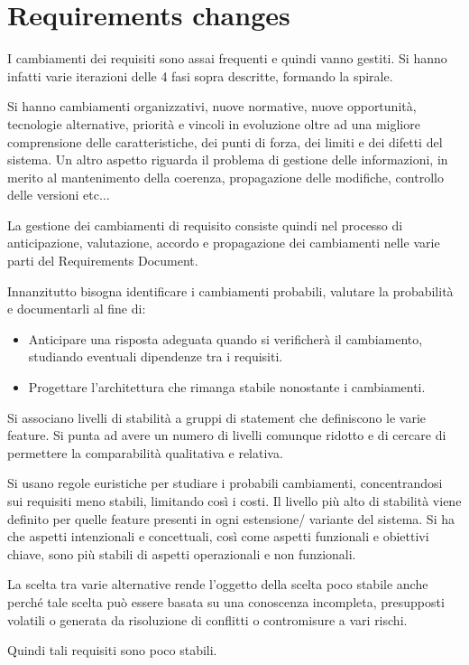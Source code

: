 \section{Requirements changes}
I cambiamenti dei requisiti sono assai frequenti e quindi vanno gestiti. Si hanno
infatti varie iterazioni delle 4 fasi sopra descritte, formando la spirale.

Si hanno cambiamenti organizzativi, nuove normative, nuove opportunità,
tecnologie alternative, priorità e vincoli in evoluzione oltre ad una migliore
comprensione delle caratteristiche, dei punti di forza, dei limiti e dei difetti
del sistema. Un altro aspetto riguarda il problema di gestione delle informazioni,
in merito al mantenimento della coerenza, propagazione delle modifiche, controllo
delle versioni etc$\dots$

La gestione dei cambiamenti di requisito consiste quindi nel processo di
anticipazione, valutazione, accordo e propagazione dei cambiamenti nelle varie
parti del Requirements Document.

Innanzitutto bisogna identificare i cambiamenti probabili, valutare la probabilità
e documentarli al fine di:
\begin{itemize}
      \item Anticipare una risposta adeguata quando si verificherà il cambiamento,
            studiando eventuali dipendenze tra i requisiti.
      \item Progettare l'architettura che rimanga stabile nonostante i cambiamenti.
\end{itemize}
Si associano  livelli di stabilità a gruppi di statement che definiscono le
varie feature. Si punta ad avere un numero di livelli comunque ridotto e di
cercare di permettere la comparabilità qualitativa e relativa.

Si usano regole euristiche per studiare i probabili cambiamenti, concentrandosi
sui requisiti meno stabili, limitando così i costi. Il livello più
alto di stabilità viene definito per quelle feature presenti in ogni estensione/
variante del sistema. Si ha che aspetti intenzionali e concettuali, così come
aspetti funzionali e obiettivi chiave, sono più stabili di aspetti operazionali
e non funzionali.

La scelta tra varie alternative rende l'oggetto della scelta poco stabile anche
perché tale scelta può essere basata su una conoscenza incompleta, presupposti
volatili o generata da risoluzione di conflitti o contromisure a vari rischi.

Quindi tali requisiti sono poco stabili.

